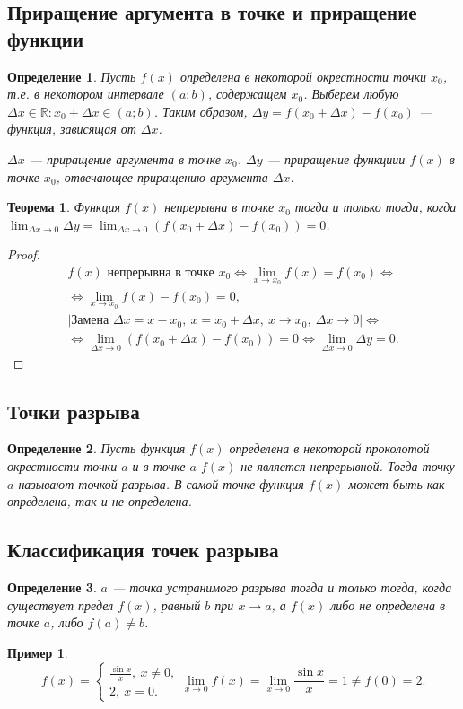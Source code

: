 \documentclass[a4paper,12pt]{article} %
\newtheorem{definition}{Определение}[section]
\newtheorem{theorem}{Теорема}[section]
\theoremstyle{remark}
\theoremstyle{definition}
\newtheorem{exmp}{Пример}[section]
\begin{document}
\subsection{Приращение аргумента в точке и приращение функции}
\begin{definition}
Пусть $f(x)$ определена в некоторой окрестности точки $x_0$, т.е. в некотором интервале $(a; b)$, содержащем $x_0$. Выберем любую $\Delta x \in \mathbb{R} : x_0+\Delta x \in (a; b)$. Таким образом, $\Delta y = f(x_0 + \Delta x) - f(x_0)$ --- функция, зависящая от $\Delta x$.

$\Delta x$ --- приращение аргумента в точке $x_0$.
$\Delta y$ --- приращение функциии $f(x)$ в точке $x_0$, отвечающее приращению аргумента $\Delta x$.
\end{definition}

\begin{theorem}
	Функция $f(x)$ непрерывна в точке $x_0$ тогда и только тогда, когда $\lim_{\Delta x \to 0} \Delta y = \lim_{\Delta x \to 0} (f(x_0+\Delta x) - f(x_0)) = 0$.
\end{theorem}
\begin{proof}
	\begin{multline}
		f(x) \text{ непрерывна в точке } x_0 \iff \lim_{x \to x_0} f(x) = f(x_0) \iff \\
		\iff \lim_{x \to x_0} f(x) - f(x_0) = 0, \\
		| \text{Замена } \Delta x = x - x_0, \ x = x_0 + \Delta x, \ x \to x_0, \ \Delta x \to 0 | \iff \\
		\iff \lim_{\Delta x \to 0} (f(x_0 + \Delta x) - f(x_0)) = 0 \iff \lim_{\Delta x \to 0} \Delta y = 0.
	\end{multline}
\end{proof}


\subsection{Точки разрыва}
\begin{definition}
	Пусть функция $f(x)$ определена в некоторой проколотой окрестности точки $a$ и в точке $a$ $f(x)$ не является непрерывной. Тогда точку $a$ называют точкой разрыва. В самой точке функция $f(x)$ может быть как определена, так и не определена.
\end{definition}

\subsection{Классификация точек разрыва}
\begin{definition}
	$a$ --- точка устранимого разрыва тогда и только тогда, когда существует предел $f(x)$, равный $b$ при $x \to a$, а $f(x)$ либо не определена в точке $a$, либо $f(a)\neq b$.	
\end{definition}
\begin{exmp}
	\[
	f(x) = \begin{cases}
		\displaystyle \frac{\sin x}{x}, \ x \neq 0, \\
		2, \ x = 0.
	\end{cases}
	\lim_{x \to 0} f(x) = \lim_{x \to 0} \frac{\sin x}{x} = 1 \neq f(0) = 2
	.\] 
\end{exmp}
\end{document}
